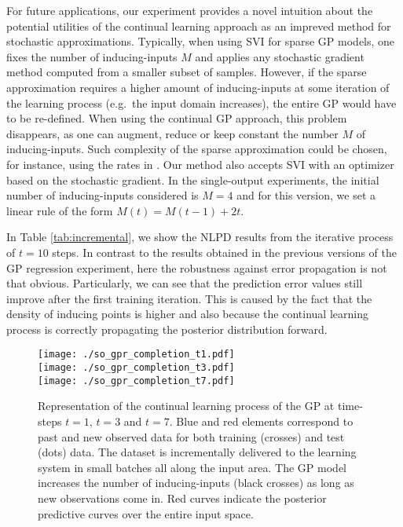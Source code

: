 \documentclass[]{article}
\begin{document}
For future applications, our experiment provides a novel intuition about the potential utilities of the continual learning approach as an impreved method for stochastic approximations. Typically, when using SVI for sparse GP models, one fixes the number of inducing-inputs $M$ and applies any stochastic gradient method computed from a smaller subset of samples. However, if the sparse approximation requires a higher amount of inducing-inputs at some iteration of the learning process (e.g.\ the input domain increases), the entire GP would have to be re-defined. When using the continual GP approach, this problem disappears, as one can augment, reduce or keep constant the number $M$ of inducing-inputs. Such complexity of the sparse approximation could be chosen, for instance, using the rates in \citet{burt2019rates}. Our method also accepts SVI with an optimizer based on the stochastic gradient. In the single-output experiments, the initial number of inducing-inputs considered is $M=4$ and for this version, we set a linear rule of the form $M(t) = M(t-1) + 2t$.

In Table \ref{tab:incremental}, we show the NLPD results from the iterative process of $t=10$ steps. In contrast to the results obtained in the previous versions of the GP regression experiment, here the robustness against error propagation is not that obvious. Particularly, we can see that the prediction error values still improve after the first training iteration. This is caused by the fact that the density of inducing points is higher and also because the continual learning process is correctly propagating the posterior distribution forward. 

\begin{figure}[] \centering
	\texttt{[image: ./so\_gpr\_completion\_t1.pdf]}\\
	\vspace{0.1cm}
	\texttt{[image: ./so\_gpr\_completion\_t3.pdf]}\\
	\vspace{0.1cm}
	\texttt{[image: ./so\_gpr\_completion\_t7.pdf]}
	\caption{Representation of the continual learning process of the GP at time-steps $t=1$, $t=3$ and $t=7$. Blue and red elements correspond to past and new observed data for both training (crosses) and test (dots) data. The dataset is incrementally delivered to the learning system in small batches all along the input area. The GP model increases the number of inducing-inputs (black crosses) as long as new observations come in. Red curves indicate the posterior predictive curves over the entire input space.}
	\label{fig:incremental}
\end{figure}
\end{document}
